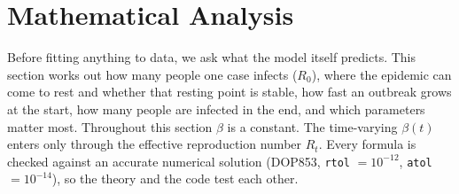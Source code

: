 \documentclass[11pt,a4paper]{article}
\begin{document}
\section{Mathematical Analysis}
\label{sec:analysis}

Before fitting anything to data, we ask what the model itself predicts. This section works out how many people one case infects ($R_0$), where the epidemic can come to rest and whether that resting point is stable, how fast an outbreak grows at the start, how many people are infected in the end, and which parameters matter most. Throughout this section $\beta$ is a constant. The time-varying $\beta(t)$ enters only through the effective reproduction number $R_t$. Every formula is checked against an accurate numerical solution (DOP853, \texttt{rtol} $=10^{-12}$, \texttt{atol} $=10^{-14}$), so the theory and the code test each other.
\end{document}
